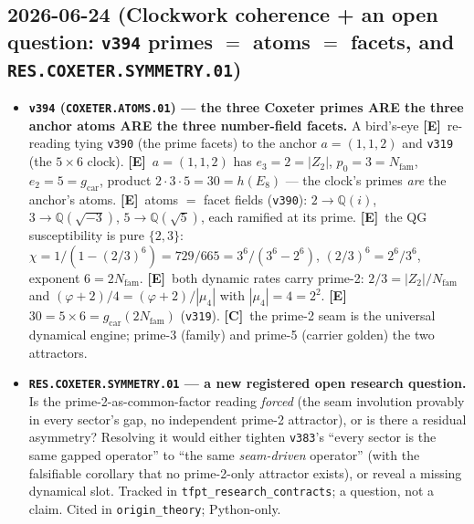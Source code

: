 \documentclass[11pt]{article}
\providecommand{\mE}{\textbf{[E]}}\providecommand{\mC}{\textbf{[C]}}
\providecommand{\vref}[1]{\texttt{#1}}
\providecommand{\gcar}{g_{\mathrm{car}}}\providecommand{\Nfam}{N_{\mathrm{fam}}}
\begin{document}
\subsection*{2026-06-24 (Clockwork coherence + an open question: \texttt{v394} primes $=$ atoms $=$ facets, and \texttt{RES.COXETER.SYMMETRY.01})}
\begin{itemize}
\item \textbf{\texttt{v394} (\texttt{COXETER.ATOMS.01}) --- the three Coxeter primes ARE the three anchor atoms ARE
the three number-field facets.} A bird's-eye \mE\ re-reading tying \vref{v390} (the prime facets) to the anchor
$a=(1,1,2)$ and \vref{v319} (the $5\times6$ clock). \mE\ $a=(1,1,2)$ has $e_3{=}2{=}|Z_2|$, $p_0{=}3{=}\Nfam$,
$e_2{=}5{=}\gcar$, product $2{\cdot}3{\cdot}5=30=h(E_8)$ --- the clock's primes \emph{are} the anchor's atoms.
\mE\ atoms $=$ facet fields (\vref{v390}): $2{\to}\mathbb Q(i)$, $3{\to}\mathbb Q(\sqrt{-3})$, $5{\to}\mathbb Q(\sqrt5)$,
each ramified at its prime. \mE\ the QG susceptibility is pure $\{2,3\}$: $\chi=1/(1{-}(2/3)^6)=729/665=3^6/(3^6{-}2^6)$,
$(2/3)^6=2^6/3^6$, exponent $6=2\Nfam$. \mE\ both dynamic rates carry prime-2: $2/3=|Z_2|/\Nfam$ and
$(\varphi{+}2)/4=(\varphi{+}2)/|\mu_4|$ with $|\mu_4|{=}4{=}2^2$. \mE\ $30=5{\times}6=\gcar(2\Nfam)$ (\vref{v319}).
\mC\ the prime-2 seam is the universal dynamical engine; prime-3 (family) and prime-5 (carrier golden) the two
attractors.
\item \textbf{\texttt{RES.COXETER.SYMMETRY.01} --- a new registered open research question.} Is the
prime-2-as-common-factor reading \emph{forced} (the seam involution provably in every sector's gap, no independent
prime-2 attractor), or is there a residual asymmetry? Resolving it would either tighten \vref{v383}'s ``every sector
is the same gapped operator'' to ``the same \emph{seam-driven} operator'' (with the falsifiable corollary that no
prime-2-only attractor exists), or reveal a missing dynamical slot. Tracked in \texttt{tfpt\_research\_contracts};
a question, not a claim. Cited in \texttt{origin\_theory}; Python-only.
\end{itemize}
\end{document}
